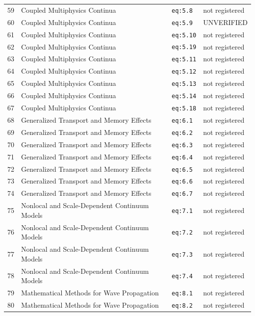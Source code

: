 \begin{longtable}{@{}p{1.1cm}p{5.6cm}p{3.4cm}p{2.9cm}@{}}
59 & Coupled Multiphysics Continua & \texttt{eq:5.8} & not registered \\
60 & Coupled Multiphysics Continua & \texttt{eq:5.9} & UNVERIFIED \\
61 & Coupled Multiphysics Continua & \texttt{eq:5.10} & not registered \\
62 & Coupled Multiphysics Continua & \texttt{eq:5.19} & not registered \\
63 & Coupled Multiphysics Continua & \texttt{eq:5.11} & not registered \\
64 & Coupled Multiphysics Continua & \texttt{eq:5.12} & not registered \\
65 & Coupled Multiphysics Continua & \texttt{eq:5.13} & not registered \\
66 & Coupled Multiphysics Continua & \texttt{eq:5.14} & not registered \\
67 & Coupled Multiphysics Continua & \texttt{eq:5.18} & not registered \\
68 & Generalized Transport and Memory Effects & \texttt{eq:6.1} & not registered \\
69 & Generalized Transport and Memory Effects & \texttt{eq:6.2} & not registered \\
70 & Generalized Transport and Memory Effects & \texttt{eq:6.3} & not registered \\
71 & Generalized Transport and Memory Effects & \texttt{eq:6.4} & not registered \\
72 & Generalized Transport and Memory Effects & \texttt{eq:6.5} & not registered \\
73 & Generalized Transport and Memory Effects & \texttt{eq:6.6} & not registered \\
74 & Generalized Transport and Memory Effects & \texttt{eq:6.7} & not registered \\
75 & Nonlocal and Scale-Dependent Continuum Models & \texttt{eq:7.1} & not registered \\
76 & Nonlocal and Scale-Dependent Continuum Models & \texttt{eq:7.2} & not registered \\
77 & Nonlocal and Scale-Dependent Continuum Models & \texttt{eq:7.3} & not registered \\
78 & Nonlocal and Scale-Dependent Continuum Models & \texttt{eq:7.4} & not registered \\
79 & Mathematical Methods for Wave Propagation & \texttt{eq:8.1} & not registered \\
80 & Mathematical Methods for Wave Propagation & \texttt{eq:8.2} & not registered \\

\end{longtable}
